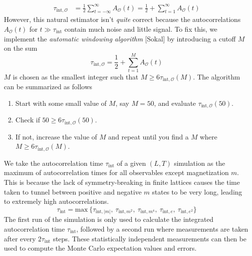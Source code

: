 \documentclass[../thesis_main.tex]{subfiles}
\begin{document}
\begin{align}
    \tau _{\text{int},\mathcal{O}} & = \frac{1}{2} \sum_{t= -\infty}^{\infty} A_\mathcal{O}(t) = \frac{1}{2} + \sum_{t=1}^{\infty} A_\mathcal{O}(t) 
    \label{autocorsum}
\end{align}   
However, this natural estimator isn't \textit{quite} correct because the autocorrelations $A_\mathcal{O}(t)$ for $t \gg \tau_\text{int}$ contain much noise and little signal. To fix this, we implement the \textit{automatic windowing algorithm} [Sokal] by introducing a cutoff $M$ on the sum
\begin{equation}
    \tau_{\text{int}, \mathcal{O}} = \frac{1}{2} + \sum_{t=1}^{M} A_\mathcal{O}(t)
\end{equation} 
$M$ is chosen as the smallest integer such that $M \geq 6 \tau_{\text{int}, \mathcal{O}}(M)$. The algorithm can be summarized as follows  
\begin{enumerate}
    \setlength{\itemsep}{0.1em}
    \item Start with some small value of $M$, say $M=50$, and evaluate $\tau _{\text{int}, \mathcal{O}}(50)$.
    \item Check if $50 \geq 6\tau _{\text{int}, \mathcal{O}}(50)$.
    \item If not, increase the value of $M$ and repeat until you find a $M$ where $M \geq 6 \tau_{\text{int}, \mathcal{O}}(M)$.           
\end{enumerate}   
We take the autocorrelation time $\tau_\text{int}$ of a given $(L, T)$ simulation as the maximum of autocorrelation times for all observables except magnetization $m$. This is because the lack of symmetry-breaking in finite lattices causes the time taken to tunnel between positive and negative $m$ states to be very long, leading to extremely high autocorrelations. 
\begin{equation}
    \tau _\text{int} = \text{max}\:\{\tau_{\text{int},|m|},\: \tau_{\text{int}, m^2},\: \tau_{\text{int}, m^4},\: \tau_{\text{int}, e},\: \tau_{\text{int}, e^2}\}
\end{equation}
The first run of the simulation is only used to calculate the integrated autocorrelation time $\tau_\text{int}$, followed by a second run where measurements are taken after every $2 \tau_\text{int}$ steps. These statistically independent measurements can then be used to compute the Monte Carlo expectation values and errors.
\end{document}
